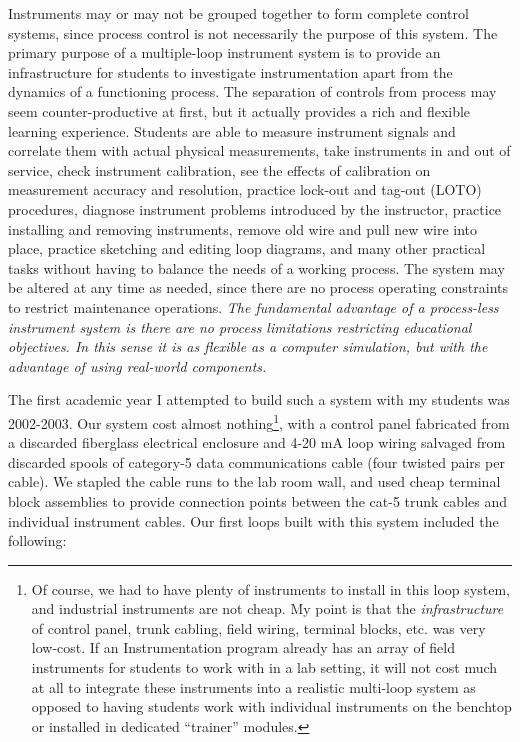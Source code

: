 Instruments may or may not be grouped together to form complete control systems, since process control is not necessarily the purpose of this system.  The primary purpose of a multiple-loop instrument system is to provide an infrastructure for students to investigate instrumentation apart from the dynamics of a functioning process.  The separation of controls from process may seem counter-productive at first, but it actually provides a rich and flexible learning experience.  Students are able to measure instrument signals and correlate them with actual physical measurements, take instruments in and out of service, check instrument calibration, see the effects of calibration on measurement accuracy and resolution, practice lock-out and tag-out (LOTO) procedures, diagnose instrument problems introduced by the instructor, practice installing and removing instruments, remove old wire and pull new wire into place, practice sketching and editing loop diagrams, and many other practical tasks without having to balance the needs of a working process.  The system may be altered at any time as needed, since there are no process operating constraints to restrict maintenance operations.  \textit{The fundamental advantage of a process-less instrument system is there are no process limitations restricting educational objectives.  In this sense it is as flexible as a computer simulation, but with the advantage of using real-world components.}    

\vskip 10pt

The first academic year I attempted to build such a system with my students was 2002-2003.  Our system cost almost nothing\footnote{Of course, we had to have plenty of instruments to install in this loop system, and industrial instruments are not cheap.  My point is that the \textit{infrastructure} of control panel, trunk cabling, field wiring, terminal blocks, etc. was very low-cost.  If an Instrumentation program already has an array of field instruments for students to work with in a lab setting, it will not cost much at all to integrate these instruments into a realistic multi-loop system as opposed to having students work with individual instruments on the benchtop or installed in dedicated ``trainer'' modules.}, with a control panel fabricated from a discarded fiberglass electrical enclosure and 4-20 mA loop wiring salvaged from discarded spools of category-5 data communications cable (four twisted pairs per cable).  We stapled the cable runs to the lab room wall, and used cheap terminal block assemblies to provide connection points between the cat-5 trunk cables and individual instrument cables.  Our first loops built with this system included the following:

